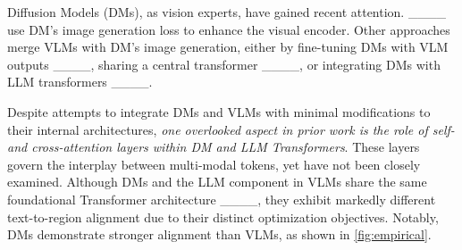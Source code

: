 Diffusion Models (DMs), as vision experts, have gained recent attention. ____ use DM’s image generation loss to enhance the visual encoder. Other approaches merge VLMs with DM’s image generation, either by fine-tuning DMs with VLM outputs ____, sharing a central transformer ____, or integrating DMs with LLM transformers ____.

Despite attempts to integrate DMs and VLMs with minimal modifications to their internal architectures, \emph{one overlooked aspect in prior work is the role of self- and cross-attention layers within DM and LLM Transformers}. These layers govern the interplay between multi-modal tokens, yet have not been closely examined. Although DMs and the LLM component in VLMs share the same foundational Transformer architecture ____, they exhibit markedly different text-to-region alignment due to their distinct optimization objectives. Notably, DMs demonstrate stronger alignment than VLMs, as shown in \cref{fig:empirical}.
